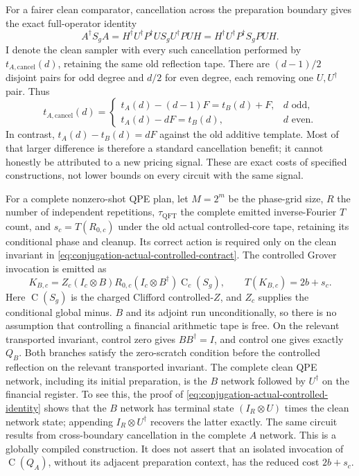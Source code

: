 \documentclass[11pt]{article}
\begin{document}
For a fairer clean comparator, cancellation across the preparation
boundary gives the exact full-operator identity
\begin{equation}
 A^\dagger S_g A
 =H^\dagger U^\dagger P^\dagger U S_g U^\dagger P U H
 =H^\dagger U^\dagger P^\dagger S_g P U H.
 \label{eq:conjugation-cross-boundary}
\end{equation}
I denote the clean sampler with every such cancellation performed by
$t_{A,\mathrm{cancel}}(d)$, retaining the same old reflection tape.
There are $(d-1)/2$ disjoint pairs for odd degree and $d/2$ for even
degree, each removing one $U,U^\dagger$ pair. Thus
\begin{equation}
 t_{A,\mathrm{cancel}}(d)=
 \begin{cases}
  t_A(d)-(d-1)F=t_B(d)+F,&d\text{ odd},\\
  t_A(d)-dF=t_B(d),&d\text{ even}.
 \end{cases}
 \label{eq:conjugation-clean-baseline}
\end{equation}
In contrast, $t_A(d)-t_B(d)=dF$ against the old additive template.
Most of that larger difference is therefore a standard cancellation
benefit; it cannot honestly be attributed to a new pricing signal.
These are exact costs of specified constructions, not lower bounds
on every circuit with the same signal.

For a complete nonzero-shot QPE plan, let $M=2^m$ be the phase-grid
size, $R$ the number of independent repetitions, $\tau_{\mathrm{QFT}}$
the complete emitted inverse-Fourier $T$ count, and
$s_c=T(R_{0,c})$ under the old actual controlled-core tape, retaining
its conditional phase and cleanup. Its correct action is required
only on the clean invariant in
\eqref{eq:conjugation-actual-controlled-contract}.
The controlled Grover invocation is emitted as
\begin{equation}
 K_{B,c}
 =Z_c(I_c\otimes B)R_{0,c}
       (I_c\otimes B^\dagger)\operatorname C_c(S_g),
 \qquad T(K_{B,c})=2b+s_c.
 \label{eq:conjugation-controlled-resource}
\end{equation}
Here $\operatorname C(S_g)$ is the charged Clifford controlled-$Z$,
and $Z_c$ supplies the conditional global minus. $B$ and its adjoint
run unconditionally, so there is no assumption that controlling a
financial arithmetic tape is free. On the relevant transported
invariant, control zero gives $BB^\dagger=I$, and control one gives
exactly $Q_B$.
Both branches satisfy the zero-scratch condition before the controlled
reflection on the relevant transported invariant. The complete clean
QPE network, including its initial preparation, is the $B$ network
followed by $U^\dagger$ on the financial register. To see this, the
proof of \eqref{eq:conjugation-actual-controlled-identity} shows that
the $B$ network
has terminal state $(I_R\otimes U)$ times the clean network state;
appending $I_R\otimes U^\dagger$ recovers the latter exactly. The
same circuit results from cross-boundary cancellation in the complete
$A$ network. This is a globally compiled construction. It does not
assert that an isolated invocation of $\operatorname C(Q_A)$, without
its adjacent preparation context, has the reduced cost
$2b+s_c$.
\end{document}
